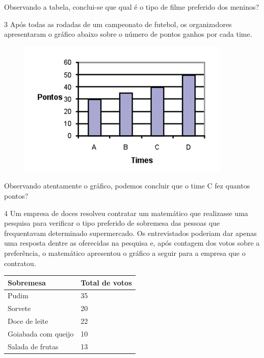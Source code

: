 Observando a tabela, conclui-se que qual é o tipo de filme preferido dos meninos?


\num{3} Após todas as rodadas de um campeonato de futebol, os organizadores
apresentaram o gráfico abaixo sobre o número de pontos ganhos por cada time.

\begin{figure}[htpb!]
\centering
\includegraphics[width=\textwidth]{./imgs/mat12.png}
\end{figure}

Observando atentamente o gráfico, podemos concluir que o time C fez quantos pontos?


\pagebreak

\num{4} Um empresa de doces resolveu contratar um matemático que realizasse
uma pesquisa para verificar o tipo preferido de sobremesa das pessoas
que frequentavam determinado supermercado. Os entrevistados poderiam dar
apenas uma resposta dentre as oferecidas na pesquisa e, após contagem dos
votos sobre a preferência, o matemático apresentou o gráfico a seguir
para a empresa que o contratou.

\begin{longtable}[]{@{}ll@{}}
\toprule
Sobremesa & Total de votos\tabularnewline
\midrule
\endhead
Pudim & 35\tabularnewline
Sorvete & 20\tabularnewline
Doce de leite & 22\tabularnewline
Goiabada com queijo & 10\tabularnewline
Salada de frutas & 13\tabularnewline
\bottomrule
\end{longtable}

